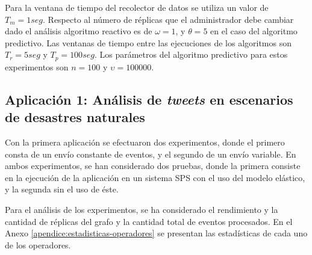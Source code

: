 Para la ventana de tiempo del recolector de datos se utiliza un valor de $T_m = 1seg$. Respecto al número de réplicas que el administrador debe cambiar dado el análisis algoritmo reactivo es de $\omega = 1$, y $\theta = 5$ en el caso del algoritmo predictivo. Las ventanas de tiempo entre las ejecuciones de los algoritmos son $T_r = 5seg$ y $T_p = 100seg$. Los parámetros del algoritmo predictivo para estos experimentos son $n = 100$ y $\upsilon = 100000$.

\subsection{Aplicación 1: Análisis de \textit{tweets} en escenarios de desastres naturales}
Con la primera aplicación se efectuaron dos experimentos, donde el primero consta de un envío constante de eventos, y el segundo de un envío variable. En ambos experimentos, se han considerado dos pruebas, donde la primera consiste en la ejecución de la aplicación en un sistema SPS con el uso del modelo elástico, y la segunda sin el uso de éste.


Para el análisis de los experimentos, se ha considerado \normalsize{el rendimiento y la cantidad de réplicas del grafo} y la cantidad total de eventos procesados. \normalsize{En el Anexo} \ref{apendice:estadisticas-operadores} \normalsize{se presentan las estadísticas de cada uno de los operadores.}




